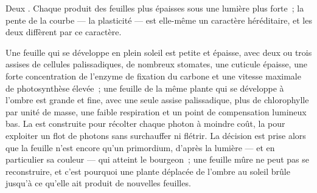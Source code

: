 \begin{omfigure}

{\small Deux . Chaque  produit des feuilles
plus épaisses sous une lumière plus forte~; la pente de la courbe --- la
plasticité --- est elle-même un caractère héréditaire, et les deux
 diffèrent par ce caractère.}
\end{omfigure}

\begin{proposition}\label{prop:b2:plant-plasticity:sunshade}
Une feuille qui se développe en plein soleil est petite et épaisse,
avec deux ou trois assises de cellules palissadiques, de nombreux
stomates, une cuticule épaisse, une forte concentration de l'enzyme de
fixation du carbone et une vitesse maximale de photosynthèse élevée~;
une feuille de la même plante qui se développe à l'ombre est grande et
fine, avec une seule assise palissadique, plus de chlorophylle par unité
de masse, une faible respiration et un point de compensation lumineux
bas. La  est construite pour récolter chaque photon à
moindre coût, la  pour exploiter un flot de photons
sans surchauffer ni flétrir. La décision est prise alors que la feuille
n'est encore qu'un primordium, d'après la lumière --- et en particulier
sa couleur --- qui atteint le bourgeon~; une feuille mûre ne peut pas se
reconstruire, et c'est pourquoi une plante déplacée de l'ombre au soleil
brûle jusqu'à ce qu'elle ait produit de nouvelles feuilles.
\end{proposition}

